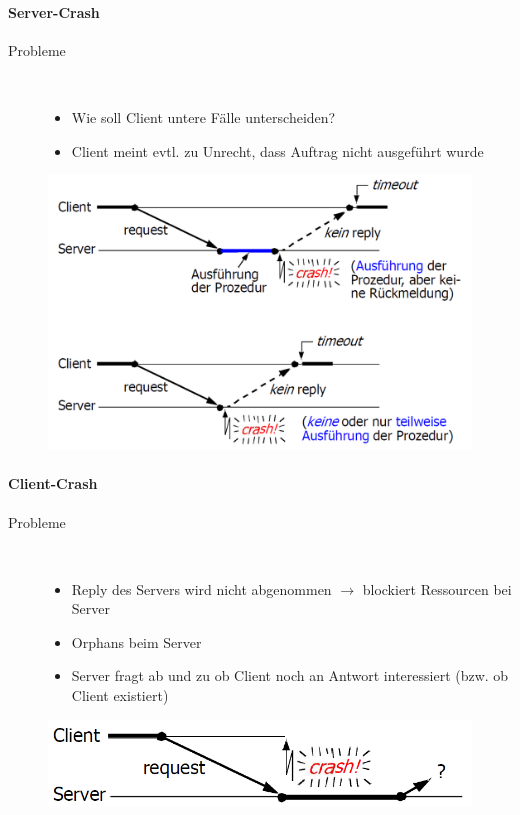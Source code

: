 \documentclass[10pt,a4paper]{article}
\begin{document}
\paragraph{Server-Crash}
\begin{description}
\item[Probleme]\hfill\\
\begin{itemize}[topsep=-100ex]
\item Wie soll Client untere Fälle unterscheiden?
\item Client meint evtl. zu Unrecht, dass Auftrag nicht ausgeführt wurde
\end{itemize}
\end{description}
\begin{figure}[h]
\includegraphics[scale=0.15]{./Bilder/Server-Crash}
\end{figure}

\paragraph{Client-Crash}
\begin{description}
\item[Probleme]\hfill\\
\begin{itemize}[topsep=-100ex]
\item Reply des Servers wird nicht abgenommen $\rightarrow$ blockiert Ressourcen bei Server
\item Orphans beim Server
\item Server fragt ab und zu ob Client noch an Antwort interessiert (bzw. ob Client existiert)
\end{itemize}
\end{description}
\begin{figure}[h]
\includegraphics[scale=0.2]{./Bilder/Client-Crash}
\end{figure}
\end{document}
